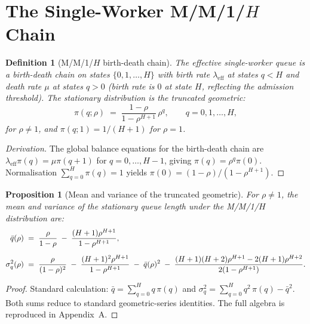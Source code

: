\documentclass[11pt,a4paper]{report}
\newtheorem{proposition}[theorem]{Proposition}
\newtheorem{definition}{Definition}[section]
\begin{document}
\section{The Single-Worker M/M/1/$H$ Chain}

\begin{definition}[M/M/1/$H$ birth-death chain]
\label{def:mmh}
The \emph{effective single-worker queue} is a birth-death chain
on states $\{0, 1, \ldots, H\}$ with birth rate $\lambda_{\text{eff}}$
at states $q < H$ and death rate $\mu$ at states $q > 0$
(birth rate is $0$ at state $H$, reflecting the admission threshold).
The stationary distribution is the truncated geometric:
\[
  \pi(q;\rho) \;=\; \frac{1-\rho}{1-\rho^{H+1}}\,\rho^q,
  \qquad q = 0, 1, \ldots, H,
\]
for $\rho \neq 1$, and $\pi(q;1) = 1/(H+1)$ for $\rho = 1$.
\end{definition}

\begin{proof}[Derivation]
The global balance equations for the birth-death chain are
$\lambda_{\text{eff}}\pi(q) = \mu\pi(q+1)$ for $q = 0,\ldots,H-1$,
giving $\pi(q) = \rho^q\pi(0)$.  Normalisation
$\sum_{q=0}^{H}\pi(q) = 1$ yields $\pi(0) = (1-\rho)/(1-\rho^{H+1})$.
\end{proof}

\begin{proposition}[Mean and variance of the truncated geometric]
\label{prop:moments}
For $\rho \neq 1$, the mean and variance of the stationary
queue length under the M/M/1/$H$ distribution are:
\begin{align}
  \bar{q}(\rho) &\;=\; \frac{\rho}{1-\rho}
    \;-\; \frac{(H+1)\rho^{H+1}}{1-\rho^{H+1}},
  \label{eq:mean}\\[6pt]
  \sigma^2_q(\rho) &\;=\; \frac{\rho}{(1-\rho)^2}
    \;-\; \frac{(H+1)^2\rho^{H+1}}{1-\rho^{H+1}}
    \;-\; \bar{q}(\rho)^2
    \;-\; \frac{(H+1)(H+2)\rho^{H+1} - 2(H+1)\rho^{H+2}}{%
          2(1-\rho^{H+1})}.
  \label{eq:var}
\end{align}
\end{proposition}

\begin{proof}
Standard calculation: $\bar{q} = \sum_{q=0}^{H} q\,\pi(q)$ and
$\sigma^2_q = \sum_{q=0}^{H} q^2\,\pi(q) - \bar{q}^2$.
Both sums reduce to standard geometric-series identities.
The full algebra is reproduced in Appendix~A.
\end{proof}
\end{document}
